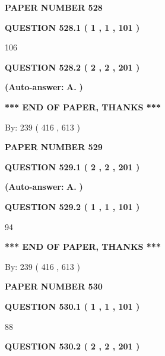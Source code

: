 \documentclass[12pt]{article}
\begin{document}
   
\newpage 
\setcounter{page}{ 
   528001 } 
   
   
 {\textbf{ \Large{ PAPER NUMBER  528  }}}
   
   
   
   
  
  
{\textbf{\large{QUESTION
528.1 
 ( 1 , 1 , 101 )
}}}

106
  
  
{\textbf{\large{QUESTION
528.2 
 ( 2 , 2 , 201 )
}}}
 
 
{\textbf{(Auto-answer:}}
{\textbf{\large{
A.}}}
{\textbf{)}}
 
 
   
   
   
   
\vspace{1.0in} 
{\textbf{\large{ *** END OF PAPER, THANKS *** }}} 
   
   
\hspace{1.0in} By: 
 239 ( 416 ,  613 )
   
   
   
   
\newpage 
\setcounter{page}{ 
   529001 } 
   
   
 {\textbf{ \Large{ PAPER NUMBER  529  }}}
   
   
   
   
  
  
{\textbf{\large{QUESTION
529.1 
 ( 2 , 2 , 201 )
}}}
 
 
{\textbf{(Auto-answer:}}
{\textbf{\large{
A.}}}
{\textbf{)}}
 
 
  
  
{\textbf{\large{QUESTION
529.2 
 ( 1 , 1 , 101 )
}}}

94
   
   
   
   
\vspace{1.0in} 
{\textbf{\large{ *** END OF PAPER, THANKS *** }}} 
   
   
\hspace{1.0in} By: 
 239 ( 416 ,  613 )
   
   
   
   
\newpage 
\setcounter{page}{ 
   530001 } 
   
   
 {\textbf{ \Large{ PAPER NUMBER  530  }}}
   
   
   
   
  
  
{\textbf{\large{QUESTION
530.1 
 ( 1 , 1 , 101 )
}}}

88
  
  
{\textbf{\large{QUESTION
530.2 
 ( 2 , 2 , 201 )
}}}
 
\end{document}
